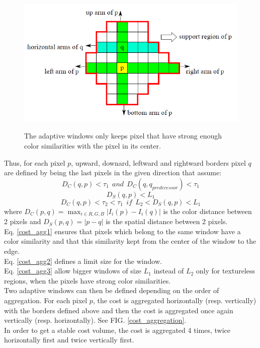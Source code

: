 \documentclass{ipol}
\begin{document}
\begin{figure}[h]
\begin{center}	
\includegraphics[scale=0.8]{Images/cost_computation.png}
	\label{cost_computation}
	\caption{ The adaptive windows only keeps pixel that have strong enough color similarities with the pixel in its center.}
\end{center}
\end{figure}

Thus, for each pixel $p$, upward, downard, leftward and rightward borders pixel $q$ are defined by being the last pixels in the given direction that assume:
\begin{equation}
	D_C(q, p) < \tau_1 \ \ and \ \ D_C(q, q_{predecessor}) < \tau_1
	\label{cost_agg1}
\end{equation}
\begin{equation}
	D_S(q, p) < L_1 
	\label{cost_agg2}
\end{equation}
\begin{equation}
	D_C(q, p) < \tau_2 < \tau_1 \ \ if \ \ L_2 <  D_S(q, p) < L_1
	\label{cost_agg3}
\end{equation}
where $D_C(p, q) = \max_{i \in R, G, B} |I_i(p) - I_i(q)|$ is the color distance between 2 pixels and  $D_S(p, q) = |p - q|$ is the spatial distance between 2 pixels.\\
Eq. \ref{cost_agg1} ensures that pixels which belong to the same window have a color similarity and that this similarity kept from the center of the window to the edge.\\
Eq. \ref{cost_agg2} defines a limit size for the window.\\
Eq. \ref{cost_agg3} allow bigger windows of size $L_1$ instead of $L_2$ only for textureless regions, when the pixels have strong color similarities.\\
Two adaptive windows can then be defined depending on the order of aggregation. For each pixel $p$, the cost is aggregated horizontally (resp. vertically) with the borders defined above and then the cost is aggregated once again vertically (resp. horizontally). See FIG. \ref{cost_aggregation}.\\
In order to get a stable cost volume, the cost is aggregated 4 times, twice horizontally first and twice vertically first.\\
\end{document}

